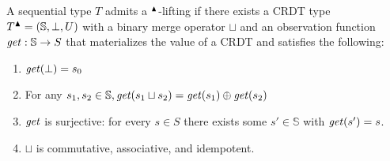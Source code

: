  





 \begin{definition}[Liftablity] \label{def:liftability}
A sequential type $T$ admits a ${}^{\blacktriangle}{}$-lifting if there exists a CRDT type $T{}^{\blacktriangle}{} = (\mathbb{S}, \bot,U)$ with a binary merge operator $\sqcup$ and an observation function $\mathit{get}: \mathbb{S} \to S$ that materializes the value  of a CRDT and satisfies the following:



\begin{enumerate}[label={L\arabic*}]
\item \label{cond:lifting1} $\mathit{get}(\bot) = s_0$
\item \label{cond:lifting2} For any $s_1, s_2 \in \mathbb{S}, \mathit{get}(s_1 \sqcup s_2) = \mathit{get}(s_1) \oplus \mathit{get}(s_2)$



\item \label{cond:lifting3} $\mathit{get}$ is surjective: for every $s \in S$ there exists some $s' \in \mathbb{S}$ with $\mathit{get}(s') = s$.
\item \label{cond:lifting4} $\sqcup$ is commutative, associative, and idempotent.
\end{enumerate}



 \end{definition}


